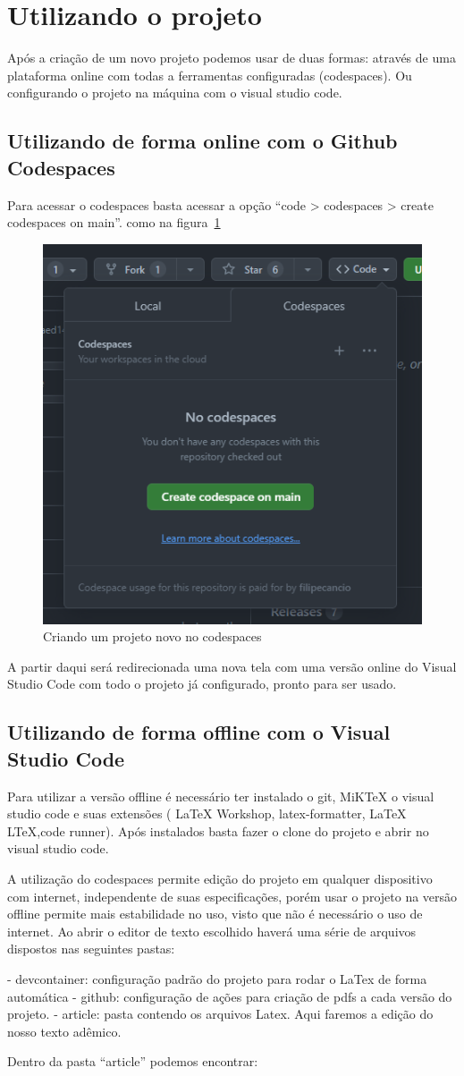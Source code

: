 \section{Utilizando o projeto}

Após a criação de um novo projeto podemos usar de duas formas: através de uma plataforma online com todas a ferramentas configuradas (codespaces). Ou configurando o projeto na máquina com o visual studio code.


\subsection{Utilizando de forma online com o Github Codespaces}

Para acessar o codespaces basta acessar a opção ``code > codespaces > create codespaces on main''. como na figura~\ref{fig:image04}

\begin{figure}[ht]
	\centering
	\includegraphics[width=.5\textwidth]{./images/image04.png}
	\caption{Criando um projeto novo no codespaces}
	\label{fig:image04}
\end{figure}

A partir daqui será redirecionada uma nova tela com uma versão online do Visual Studio Code com todo o projeto já configurado, pronto para ser usado.

\subsection{Utilizando de forma offline com o Visual Studio Code}

Para utilizar a versão offline é necessário ter instalado o git, MiKTeX o visual studio code e suas extensões (
LaTeX Workshop, latex-formatter, LaTeX LTeX,code runner). Após instalados basta fazer o clone do projeto e abrir no visual studio code.


A utilização do codespaces permite edição do projeto em qualquer dispositivo com internet, independente de suas especificações, porém usar o projeto na versão offline permite mais estabilidade no uso, visto que não é necessário o uso de internet.
Ao abrir o editor de texto escolhido haverá uma série de arquivos dispostos nas seguintes pastas:

- devcontainer: configuração padrão do projeto para rodar o LaTex de forma automática
- github: configuração de ações para criação de pdfs a cada versão do projeto.
- article: pasta contendo os arquivos Latex. Aqui faremos a edição do nosso texto adêmico.

Dentro da pasta ``article'' podemos encontrar:
